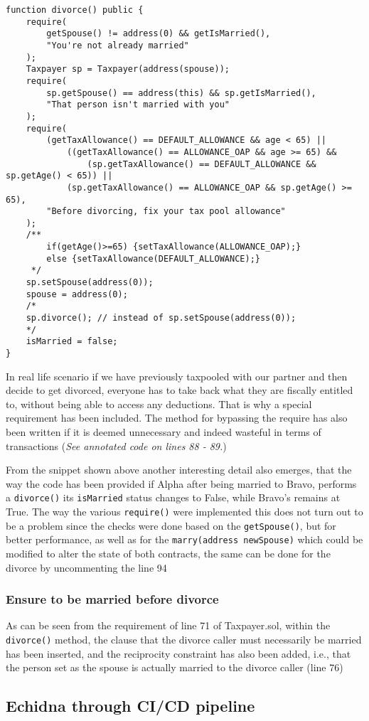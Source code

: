 \documentclass{article}
\begin{document}
\begin{verbatim}
function divorce() public {
    require(
        getSpouse() != address(0) && getIsMarried(),
        "You're not already married"
    );
    Taxpayer sp = Taxpayer(address(spouse));
    require(
        sp.getSpouse() == address(this) && sp.getIsMarried(),
        "That person isn't married with you"
    );
    require(
        (getTaxAllowance() == DEFAULT_ALLOWANCE && age < 65) ||
            ((getTaxAllowance() == ALLOWANCE_OAP && age >= 65) &&
                (sp.getTaxAllowance() == DEFAULT_ALLOWANCE && sp.getAge() < 65)) ||
            (sp.getTaxAllowance() == ALLOWANCE_OAP && sp.getAge() >= 65),
        "Before divorcing, fix your tax pool allowance"
    ); 
    /**
        if(getAge()>=65) {setTaxAllowance(ALLOWANCE_OAP);}
        else {setTaxAllowance(DEFAULT_ALLOWANCE);}
     */
    sp.setSpouse(address(0));
    spouse = address(0);
    /*
    sp.divorce(); // instead of sp.setSpouse(address(0));
    */
    isMarried = false;
}
\end{verbatim}
In real life scenario if we have previously taxpooled with our partner and then decide to get divorced, everyone has to take back what they are fiscally entitled to, without being able to access any deductions. That is why a special requirement has been included. The method for bypassing the require has also been written if it is deemed unnecessary and indeed wasteful in terms of transactions (\textit{See annotated code on lines 88 - 89.})

From the snippet shown above another interesting detail also emerges, that the way the code has been provided if Alpha after being married to Bravo, performs a \texttt{divorce()} its \texttt{isMarried} status changes to False, while Bravo's remains at True. The way the various \texttt{require()} were implemented this does not turn out to be a problem since the checks were done based on the \texttt{getSpouse()}, but for better performance, as well as for the \texttt{marry(address newSpouse)} which could be modified to alter the state of both contracts, the same can be done for the divorce by uncommenting the line 94
\subsubsection{Ensure to be married before divorce}
As can be seen from the requirement of line 71 of Taxpayer.sol, within the \texttt{divorce()} method, the clause that the divorce caller must necessarily be married has been inserted, and the reciprocity constraint has also been added, i.e., that the person set as the spouse is actually married to the divorce caller (line 76)
\subsection{Echidna through CI/CD pipeline}
\end{document}
